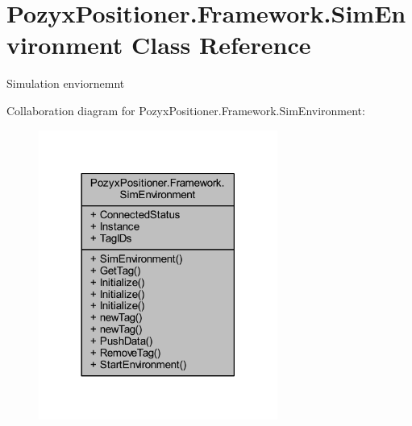 \hypertarget{class_pozyx_positioner_1_1_framework_1_1_sim_environment}{}\section{Pozyx\+Positioner.\+Framework.\+Sim\+Environment Class Reference}
\label{class_pozyx_positioner_1_1_framework_1_1_sim_environment}


Simulation enviornemnt  




Collaboration diagram for Pozyx\+Positioner.\+Framework.\+Sim\+Environment\+:
\nopagebreak
\begin{figure}[H]
\begin{center}
\leavevmode
\includegraphics[width=222pt]{class_pozyx_positioner_1_1_framework_1_1_sim_environment__coll__graph}
\end{center}
\end{figure}
